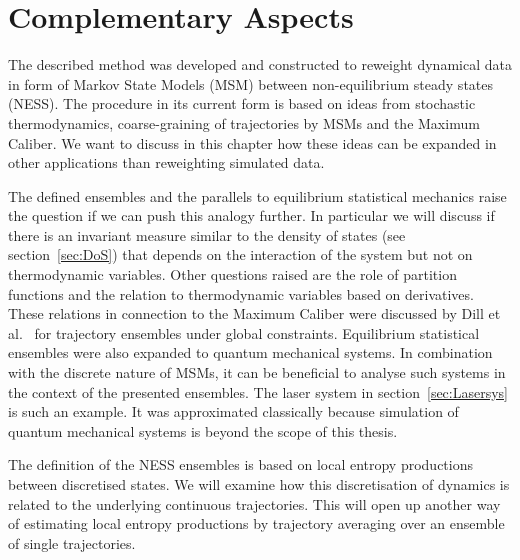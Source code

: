 % 
% 
% 
% 
% 
% 
% 



\chapter{Complementary Aspects}
\label{ch:Complementary}
The described method was developed and constructed to reweight dynamical data in form of Markov State Models (MSM) between non-equilibrium steady states (NESS). The procedure in its current form is based on ideas from stochastic thermodynamics, coarse-graining of trajectories by MSMs and the Maximum Caliber. We want to discuss in this chapter how these ideas can be expanded in other applications than reweighting simulated data.

The defined ensembles and the parallels to equilibrium statistical mechanics raise the question if we can push this analogy further. In particular we will discuss if there is an invariant measure similar to the density of states (see section~\ref{sec:DoS}) that depends on the interaction of the system but not on thermodynamic variables. Other questions raised are the role of partition functions and the relation to thermodynamic variables based on derivatives. These relations in connection to the Maximum Caliber were discussed by Dill et al.~\cite{dixit2018perspective} for trajectory ensembles under global constraints.  Equilibrium statistical ensembles were also expanded to quantum mechanical systems. In combination with the discrete nature of MSMs, it can be beneficial to analyse such systems in the context of the presented ensembles. The laser system in section~\ref{sec:Lasersys} is such an example. It was approximated classically because simulation of quantum mechanical systems is beyond the scope of this thesis. 

The definition of the NESS ensembles is based on local entropy productions between discretised states. We will examine how this discretisation of dynamics is related to the underlying continuous trajectories. This will open up another way of estimating local entropy productions by trajectory averaging over an ensemble of single trajectories.

